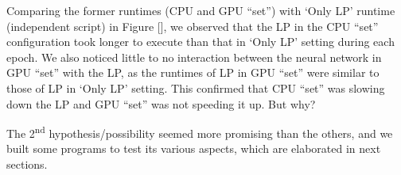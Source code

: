 \begin{appendices}
    Comparing the former runtimes (CPU and GPU ``set'') with `Only LP' runtime (independent script) in Figure [], we observed that the LP in the CPU ``set'' configuration took longer to execute than that in  `Only LP' setting during each epoch. We also noticed little to no interaction between the neural network in GPU ``set'' with the LP, as the runtimes of LP in GPU ``set'' were similar to those of LP in `Only LP' setting. This confirmed that CPU ``set'' was slowing down the LP and GPU ``set'' was not speeding it up. But why?
    \begin{figure}[!htbp]
        \centering
    \end{figure}
    
    
    The 2\textsuperscript{nd} hypothesis/possibility seemed more promising than the others, and we built some programs to test its various aspects, which are elaborated in next sections.
    

\end{appendices}
